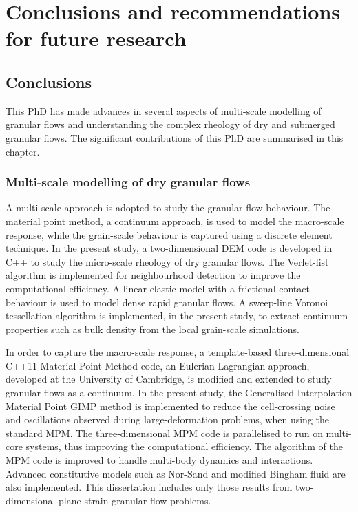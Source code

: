\chapter{Conclusions and recommendations for future research}

\ifpdf
    \graphicspath{{Chapter7/figs/raster/}{Chapter7/figs/pdf/}{Chapter7/figs/}}
\else
    \graphicspath{{Chapter7/figs/vector/}{Chapter7/figs/}}
\fi
\section{Conclusions}

This PhD has made advances in several aspects of multi-scale modelling of 
granular flows and understanding the complex rheology of dry and submerged 
granular flows. The significant contributions of this PhD are summarised in 
this chapter.

\subsection{Multi-scale modelling of dry granular flows}

A multi-scale approach is adopted to study the granular flow behaviour. The 
material point method, a continuum approach, is used to model the macro-scale 
response, while the grain-scale behaviour is captured using a discrete element 
technique. In the present study, a two-dimensional DEM code is developed in C++ 
to study the micro-scale rheology of dry granular flows. The Verlet-list 
algorithm is implemented for neighbourhood detection to improve the 
computational efficiency. A linear-elastic model with a frictional contact 
behaviour is used to model dense rapid granular flows. A sweep-line Voronoi 
tessellation algorithm is implemented, in the present study, to extract 
continuum properties such as bulk density from the local grain-scale 
simulations.

In order to capture the macro-scale response, a template-based 
three-dimensional C++11 Material Point Method code, an Eulerian-Lagrangian 
approach, developed at the University of Cambridge, is modified and extended to 
study granular flows as a continuum. In the present study, the Generalised 
Interpolation Material Point GIMP method is implemented to reduce the 
cell-crossing noise and oscillations observed during large-deformation 
problems, when using the standard MPM. The three-dimensional MPM code is 
parallelised to run on multi-core systems, thus improving the computational 
efficiency. The algorithm of the MPM code is improved to handle multi-body 
dynamics and interactions. Advanced constitutive models such as Nor-Sand and 
modified Bingham fluid are also implemented. This dissertation includes 
only those results from two-dimensional plane-strain granular flow problems. 


